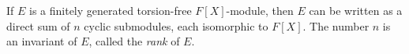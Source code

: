 If $E$ is a finitely generated torsion-free $F[X]$-module, then $E$ can be written as a direct sum of $n$ cyclic submodules, each isomorphic to $F[X]$. The number $n$ is an invariant of $E$, called the \emph{rank} of $E$.

